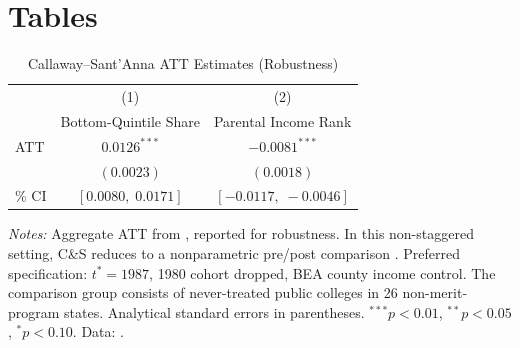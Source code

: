 
\section{Tables}
\label{sec:tables}





\begin{table}[H]
\centering
\begin{threeparttable}
\caption{Callaway--Sant'Anna ATT Estimates (Robustness)}
\label{tab:cs_main}
\begin{tabular}{lcc}
\toprule
 & (1) & (2) \\
 & Bottom-Quintile Share & Parental Income Rank \\
\midrule
ATT & $0.0126^{***}$ & $-0.0081^{***}$ \\
    & $(0.0023)$ & $(0.0018)$ \\
\addlinespace
95\% CI & $[0.0080,\; 0.0171]$ & $[-0.0117,\; -0.0046]$ \\
\bottomrule
\end{tabular}
\begin{tablenotes}[flushleft]
\footnotesize
\item \textit{Notes:} Aggregate ATT from
  \textcite{callaway2021difference}, reported for robustness.
  In this non-staggered setting, C\&S reduces to a nonparametric
  pre/post comparison \parencite{roth2026interpreting}. Preferred
  specification:
  $t^* = 1987$, 1980 cohort dropped, BEA county income control.
  The comparison group consists of never-treated public colleges in
  26 non-merit-program states. Analytical standard errors in
  parentheses. $^{***}p<0.01$, $^{**}p<0.05$, $^{*}p<0.10$.
  Data: \textcite{chetty2020mobility}.
\end{tablenotes}
\end{threeparttable}
\end{table}




